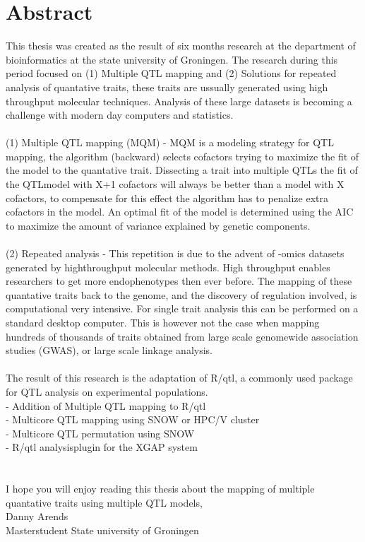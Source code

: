 \section*{Abstract}
This thesis was created as the result of six months research at the department of bioinformatics at the state university of Groningen.
The research during this period focused on (1) Multiple QTL mapping and (2) Solutions for repeated analysis of quantative traits,
these traits are ussually generated using high throughput molecular techniques. Analysis of these large datasets is becoming a challenge with
modern day computers and statistics.
\\\\
(1) Multiple QTL mapping (MQM) - MQM is a modeling strategy for QTL mapping, the algorithm (backward) selects cofactors trying to maximize the fit of the 
model to the quantative trait. Dissecting a trait into multiple QTLs the fit of the QTLmodel with X+1 cofactors will always be better than a model with X cofactors, 
to compensate for this effect the algorithm has to penalize extra cofactors in the model. An optimal fit of the model is determined using the AIC to maximize 
the amount of variance explained by genetic components.
\\\\
(2) Repeated analysis - This repetition is due to the advent of -omics datasets generated by highthroughput molecular methods. High throughput
 enables researchers to get more endophenotypes then ever before. The mapping of these quantative traits back to the genome, and the discovery of
regulation involved, is computational very intensive. For single trait analysis this can be performed on a standard desktop computer.
This is however not the case when mapping hundreds of thousands of traits obtained from large scale genomewide association studies (GWAS), or large scale linkage analysis.
\\\\
The result of this research is the adaptation of R/qtl, a commonly used package for QTL analysis on experimental populations.
  \\- Addition of Multiple QTL mapping to R/qtl
  \\- Multicore QTL mapping using SNOW or HPC/V cluster
  \\- Multicore QTL permutation using SNOW
  \\- R/qtl analysisplugin for the XGAP system
\\\\\\
I hope you will enjoy reading this thesis about the mapping of multiple quantative traits using multiple QTL models,
\\
Danny Arends
\\
Masterstudent State university of Groningen